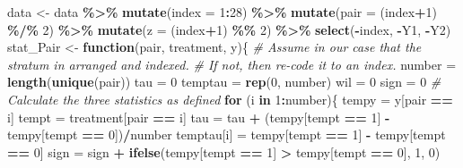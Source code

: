 \documentclass[]{article}
\newenvironment{Shaded}{\begin{snugshade}}{\end{snugshade}}
\newcommand{\KeywordTok}[1]{\textcolor[rgb]{0.13,0.29,0.53}{\textbf{#1}}}
\newcommand{\DataTypeTok}[1]{\textcolor[rgb]{0.13,0.29,0.53}{#1}}
\newcommand{\DecValTok}[1]{\textcolor[rgb]{0.00,0.00,0.81}{#1}}
\newcommand{\StringTok}[1]{\textcolor[rgb]{0.31,0.60,0.02}{#1}}
\newcommand{\CommentTok}[1]{\textcolor[rgb]{0.56,0.35,0.01}{\textit{#1}}}
\newcommand{\ControlFlowTok}[1]{\textcolor[rgb]{0.13,0.29,0.53}{\textbf{#1}}}
\newcommand{\OperatorTok}[1]{\textcolor[rgb]{0.81,0.36,0.00}{\textbf{#1}}}
\newcommand{\NormalTok}[1]{#1}
\begin{document}
\begin{Shaded}
\begin{Highlighting}[]
\NormalTok{data <-}\StringTok{ }\NormalTok{data }\OperatorTok{\%>\%}
\StringTok{  }\KeywordTok{mutate}\NormalTok{(}\DataTypeTok{index =} \DecValTok{1}\OperatorTok{:}\DecValTok{28}\NormalTok{) }\OperatorTok{\%>\%}
\StringTok{  }\KeywordTok{mutate}\NormalTok{(}\DataTypeTok{pair =}\NormalTok{ (index}\OperatorTok{+}\DecValTok{1}\NormalTok{) }\OperatorTok{\%/\%}\StringTok{ }\DecValTok{2}\NormalTok{) }\OperatorTok{\%>\%}
\StringTok{  }\KeywordTok{mutate}\NormalTok{(}\DataTypeTok{z =}\NormalTok{ (index}\OperatorTok{+}\DecValTok{1}\NormalTok{) }\OperatorTok{\%\%}\StringTok{ }\DecValTok{2}\NormalTok{) }\OperatorTok{\%>\%}
\StringTok{  }\KeywordTok{select}\NormalTok{(}\OperatorTok{-}\NormalTok{index, }\OperatorTok{-}\NormalTok{Y1, }\OperatorTok{-}\NormalTok{Y2)}
\NormalTok{stat_Pair <-}\StringTok{ }\ControlFlowTok{function}\NormalTok{(pair, treatment, y)\{}
  \CommentTok{# Assume in our case that the stratum in arranged and indexed.}
  \CommentTok{# If not, then re-code it to an index.}
\NormalTok{  number =}\StringTok{ }\KeywordTok{length}\NormalTok{(}\KeywordTok{unique}\NormalTok{(pair))}
\NormalTok{  tau =}\StringTok{ }\DecValTok{0}
\NormalTok{  temptau =}\StringTok{ }\KeywordTok{rep}\NormalTok{(}\DecValTok{0}\NormalTok{, number)}
\NormalTok{  wil =}\StringTok{ }\DecValTok{0}
\NormalTok{  sign =}\StringTok{ }\DecValTok{0}
  \CommentTok{# Calculate the three statistics as defined}
  \ControlFlowTok{for}\NormalTok{ (i }\ControlFlowTok{in} \DecValTok{1}\OperatorTok{:}\NormalTok{number)\{}
\NormalTok{    tempy =}\StringTok{ }\NormalTok{y[pair }\OperatorTok{==}\StringTok{ }\NormalTok{i]}
\NormalTok{    tempt =}\StringTok{ }\NormalTok{treatment[pair }\OperatorTok{==}\StringTok{ }\NormalTok{i]}
\NormalTok{    tau =}\StringTok{ }\NormalTok{tau }\OperatorTok{+}\StringTok{ }\NormalTok{(tempy[tempt }\OperatorTok{==}\StringTok{ }\DecValTok{1}\NormalTok{] }\OperatorTok{-}\StringTok{ }\NormalTok{tempy[tempt }\OperatorTok{==}\StringTok{ }\DecValTok{0}\NormalTok{])}\OperatorTok{/}\NormalTok{number}
\NormalTok{    temptau[i] =}\StringTok{ }\NormalTok{tempy[tempt }\OperatorTok{==}\StringTok{ }\DecValTok{1}\NormalTok{] }\OperatorTok{-}\StringTok{ }\NormalTok{tempy[tempt }\OperatorTok{==}\StringTok{ }\DecValTok{0}\NormalTok{]}
\NormalTok{    sign =}\StringTok{ }\NormalTok{sign }\OperatorTok{+}\StringTok{ }\KeywordTok{ifelse}\NormalTok{(tempy[tempt }\OperatorTok{==}\StringTok{ }\DecValTok{1}\NormalTok{] }\OperatorTok{>}\StringTok{ }\NormalTok{tempy[tempt }\OperatorTok{==}\StringTok{ }\DecValTok{0}\NormalTok{], }\DecValTok{1}\NormalTok{, }\DecValTok{0}\NormalTok{)}

\end{Highlighting}
\end{Shaded}
\end{document}
